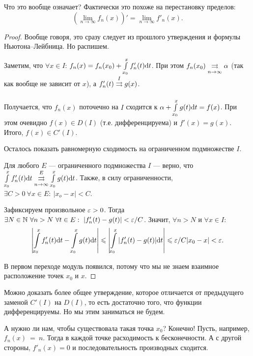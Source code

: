 \documentclass[a4paper, 12pt]{article}
\begin{document}
Что это вообще означает? Фактически это похоже на перестановку пределов:
$$
(\lim\limits_{n \to \infty} f_n(x))' = \lim\limits_{n \to \infty} f'_n(x). 
$$

\begin{proof}
Вообще говоря, это сразу следует из прошлого утверждения и формулы Ньютона--Лейбница. Но распишем.

Заметим, что $\forall x \in I$: $f_n(x) = f_n(x_0) + \int\limits_{x_0}^x f'_n(t) \mathrm{d} t$. При этом $f_n(x_0) \overset{}{\underset{n \to \infty}{\rightrightarrows}} \alpha$ (так как вообще не зависит от $x$), а $f'_n(t) \overset{I}{\underset{}{\rightrightarrows}} g(x)$.

Получается, что $f_n(x)$ поточечно на $I$ сходится к $\alpha + \int\limits_{x_0}^x g(t)\mathrm{d} t = f(x)$. При этом очевидно $f(x) \in D(I)$ (т.е. дифференцируема) и $f'(x) = g(x)$. Итого, $f(x) \in C'(I)$.

Осталось показать равномерную сходимость на ограниченном подмножестве $I$.

Для любого $E$ --- ограниченного подмножества $I$ --- верно, что $\int\limits_{x_0}^xf'_n(t) \mathrm{d} t \overset{E}{\underset{n \to \infty}{\rightrightarrows}} \int\limits_{x_0}^x g(t) \mathrm{d} t$. Также, в силу ограниченности, $\exists C > 0\ \forall x \in E: \ |x_o - x| < C$.

Зафиксируем произвольное $\varepsilon > 0$. Тогда $\exists N \in \mathbb{N}\ \forall n > N\ \forall t \in E:\ |f'_n(t) - g(t)| < \varepsilon/C$. Значит, $\forall n > N$ и $\forall x \in I$:
\begin{gather}
\left| \int\limits_{x_0}^x f'_n(t) \mathrm{d} t - \int\limits_{x_0}^x g(t) \mathrm{d} t \right| \leqslant \left| \int\limits_{x_0}^x |f'_n(t) - g(t)| \mathrm{d} t \right| \leqslant \varepsilon/C |x_0 - x| < \varepsilon.
\end{gather}

В первом переходе модуль появился, потому что мы не знаем взаимное расположение точек $x_0$ и $x$.
\end{proof}

Можно доказать более общее утверждение, которое отличается от предыдущего заменой $C'(I)$ на $D(I)$, то есть достаточно того, что функции дифференцируемы. Но мы этим заниматься не будем.

А нужно ли нам, чтобы существовала такая точка $x_0$? Конечно! Пусть, например, $f_n(x)~=~n$. Тогда в каждой точке расходимость к бесконечности. А с другой стороны, $f'_n(x) = 0$ и последовательность производных сходится.
\end{document}
